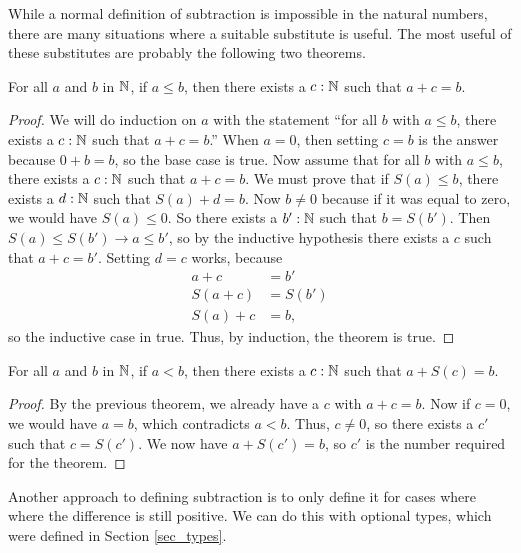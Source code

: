 \documentclass[../math.tex]{subfiles}
\begin{document}
While a normal definition of subtraction is impossible in the natural numbers,
there are many situations where a suitable substitute is useful.  The most
useful of these substitutes are probably the following two theorems.

\begin{theorem} \label{nat_le_ex}
    For all $a$ and $b$ in $\mathbb{N}$, if $a \leq b$, then there exists a $c : \mathbb{N}$
    such that $a + c = b$.
\end{theorem}
\begin{proof}
    We will do induction on $a$ with the statement ``for all $b$ with $a \leq
    b$, there exists a $c : \mathbb{N}$ such that $a + c = b$.''  When $a = 0$, then
    setting $c = b$ is the answer because $0 + b = b$, so the base case is true.
    Now assume that for all $b$ with $a \leq b$, there exists a $c : \mathbb{N}$ such
    that $a + c = b$.  We must prove that if $S(a) \leq b$, there exists a $d :
    \mathbb{N}$ such that $S(a) + d = b$.  Now $b \neq 0$ because if it was equal to
    zero, we would have $S(a) \leq 0$.  So there exists a $b' : \mathbb{N}$ such that $b
    = S(b')$.  Then $S(a) \leq S(b') \rightarrow a \leq b'$, so by the inductive
    hypothesis there exists a $c$ such that $a + c = b'$.  Setting $d = c$
    works, because
    \begin{align*}
        a + c &= b' \\
        S(a + c) &= S(b') \\
        S(a) + c &= b,
    \end{align*}
    so the inductive case in true.  Thus, by induction, the theorem is true.
\end{proof}

\begin{theorem} \label{nat_lt_ex}
    For all $a$ and $b$ in $\mathbb{N}$, if $a < b$, then there exists a $c : \mathbb{N}$
    such that $a + S(c) = b$.
\end{theorem}
\begin{proof}
    By the previous theorem, we already have a $c$ with $a + c = b$.  Now if $c
    = 0$, we would have $a = b$, which contradicts $a < b$.  Thus, $c \neq 0$,
    so there exists a $c'$ such that $c = S(c')$.  We now have $a + S(c') = b$,
    so $c'$ is the number required for the theorem.
\end{proof}

Another approach to defining subtraction is to only define it for cases where
where the difference is still positive.  We can do this with optional types,
which were defined in Section \ref{sec_types}.
\end{document}
